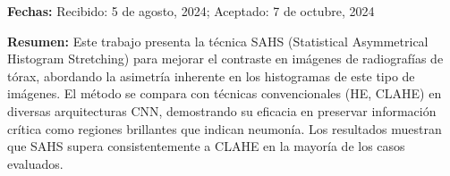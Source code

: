 \textbf{Fechas:} Recibido: 5 de agosto, 2024; Aceptado: 7 de octubre, 2024

\textbf{Resumen:} Este trabajo presenta la técnica SAHS (Statistical Asymmetrical Histogram Stretching) para mejorar el contraste en imágenes de radiografías de tórax, abordando la asimetría inherente en los histogramas de este tipo de imágenes. El método se compara con técnicas convencionales (HE, CLAHE) en diversas arquitecturas CNN, demostrando su eficacia en preservar información crítica como regiones brillantes que indican neumonía. Los resultados muestran que SAHS supera consistentemente a CLAHE en la mayoría de los casos evaluados.



